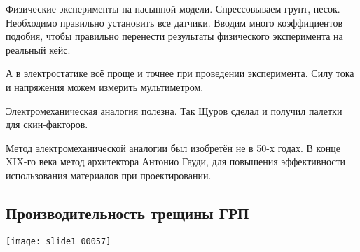\documentclass[main.tex]{subfiles}
\begin{document}
Физические эксперименты на насыпной модели. Спрессовываем грунт, песок. Необходимо правильно установить все датчики. Вводим много коэффициентов подобия, чтобы правильно перенести результаты физического эксперимента на реальный кейс.

А в электростатике всё проще и точнее при проведении эксперимента. Силу тока и напряжения можем измерить мультиметром.

Электромеханическая аналогия полезна. Так Щуров сделал и получил палетки для скин-факторов.


Метод электромеханической аналогии был изобретён не в 50-х годах. В конце XIX-го века метод архитектора Антонио Гауди, для повышения эффективности использования материалов при проектировании.













\subsection{Производительность трещины ГРП}

\texttt{[image: slide1\_00057]}










\end{document}
